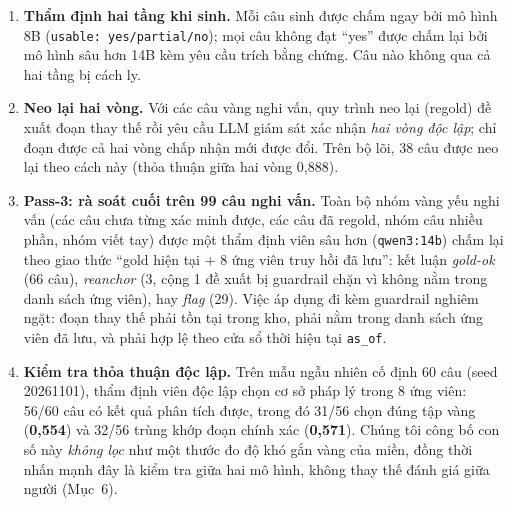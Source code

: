 \documentclass[11pt,a4paper]{article}
\begin{document}
\begin{enumerate}
\item \textbf{Thẩm định hai tầng khi sinh.} Mỗi câu sinh được chấm ngay bởi mô hình 8B (\texttt{usable: yes/partial/no}); mọi câu không đạt ``yes'' được chấm lại bởi mô hình sâu hơn 14B kèm yêu cầu trích bằng chứng. Câu nào không qua cả hai tầng bị cách ly.
\item \textbf{Neo lại hai vòng.} Với các câu vàng nghi vấn, quy trình neo lại (regold) đề xuất đoạn thay thế rồi yêu cầu LLM giám sát xác nhận \emph{hai vòng độc lập}; chỉ đoạn được cả hai vòng chấp nhận mới được đổi. Trên bộ lõi, 38 câu được neo lại theo cách này (thỏa thuận giữa hai vòng 0,888).
\item \textbf{Pass-3: rà soát cuối trên 99 câu nghi vấn.} Toàn bộ nhóm vàng yếu nghi vấn (các câu chưa từng xác minh được, các câu đã regold, nhóm câu nhiều phần, nhóm viết tay) được một thẩm định viên sâu hơn (\texttt{qwen3:14b}) chấm lại theo giao thức ``gold hiện tại + 8 ứng viên truy hồi đã lưu'': kết luận \emph{gold-ok} (66 câu), \emph{reanchor} (3, cộng 1 đề xuất bị guardrail chặn vì không nằm trong danh sách ứng viên), hay \emph{flag} (29). Việc áp dụng đi kèm guardrail nghiêm ngặt: đoạn thay thế phải tồn tại trong kho, phải nằm trong danh sách ứng viên đã lưu, và phải hợp lệ theo cửa sổ thời hiệu tại \texttt{as\_of}.
\item \textbf{Kiểm tra thỏa thuận độc lập.} Trên mẫu ngẫu nhiên cố định 60 câu (seed 20261101), thẩm định viên độc lập chọn cơ sở pháp lý trong 8 ứng viên: 56/60 câu có kết quả phân tích được, trong đó 31/56 chọn đúng tập vàng (\textbf{0,554}) và 32/56 trùng khớp đoạn chính xác (\textbf{0,571}). Chúng tôi công bố con số này \emph{không lọc} như một thước đo độ khó gắn vàng của miền, đồng thời nhấn mạnh đây là kiểm tra giữa hai mô hình, không thay thế đánh giá giữa người (Mục~6).
\end{enumerate}
\end{document}

